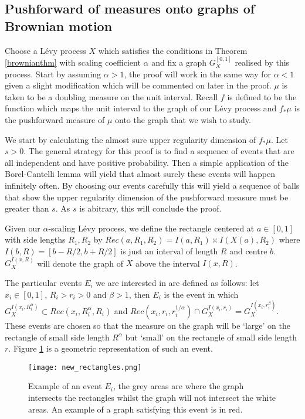 \subsection{Pushforward of measures onto graphs of Brownian motion}


Choose a L\'evy process $X$ which satisfies the conditions in Theorem \ref{brownianthm} with scaling coefficient $\alpha$ and fix a graph $G_X^{[0,1]}$ realised by this process. Start by assuming $\alpha > 1$, the proof will work in the same way for $\alpha < 1$ given a slight modification which will be commented on later in the proof. $\mu$ is taken to be a doubling measure on the unit interval. Recall $f$ is defined to be the function which maps the unit interval to the graph of our L\'evy process and $f_*\mu$ is the pushforward measure of $\mu$ onto the graph that we wish to study. 

We start by calculating the almost sure upper regularity dimension of $f_*\mu$. Let $s>0$. The general strategy for this proof is to find a sequence of events that are all independent and have positive probability. Then a simple application of the Borel-Cantelli lemma will yield that almost surely these events will happen infinitely often. By choosing our events carefully this will yield a sequence of balls that show the upper regularity dimension of the pushforward measure must be greater than $s$. As $s$ is abitrary, this will conclude the proof.

Given our $\alpha$-scaling L\'evy process, we define the rectangle centered at $a\in [0,1]$ with side lengths $R_1,R_2$ by $Rec(a,R_1,R_2) = I(a,R_1) \times I(X(a),R_2)$ where $I(b,R) = [b-R/2,b+R/2]$ is just an interval of length $R$ and centre $b$. $G_X^{I(x,R)}$ will denote the graph of $X$ above the interval $I(x,R)$.

The particular events $E_i$ we are interested in are defined as follows: let $x_i \in [0,1]$, $R_i > r_i> 0$ and $\beta > 1$, then $E_i$ is the event in which $G_X^{I(x_i,R_i^{\alpha})} \subset Rec(x_i,R_i^{\alpha},R_i)$ and $Rec(x_i, r_i, r_i^{1/\alpha}) \cap G_X^{I(x_i,r_i)} = G_X^{I(x_i,r_i^{\beta})}$. These events are chosen so that the measure on the graph will be `large' on the rectangle of small side length $R^{\alpha}$ but `small' on the rectangle of small side length $r$. Figure \ref{brownian_event} is a geometric representation of such an event.  

\begin{figure}[htbp]
	\centering
	\texttt{[image: new\_rectangles.png]}
	\caption{Example of an event $E_i$, the grey areas are where the graph intersects the rectangles whilst the graph will not intersect the white areas. An example of a graph satisfying this event is in red.}
	\label{brownian_event}
\end{figure}


